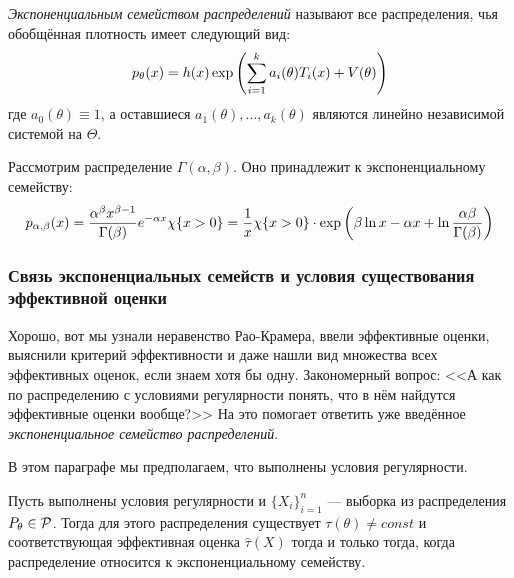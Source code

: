 \begin{definition}
	\textit{Экспоненциальным семейством распределений} называют все распределения, чья обобщённая плотность имеет следующий вид:
	\[
		p_\theta(x) = h(x)\exp\left(\sum_{i = 1}^k a_i(\theta)T_i(x) + V(\theta)\right)
	\]
	где $a_0(\theta) \equiv 1$, а оставшиеся $a_1(\theta), \ldots, a_k(\theta)$ являются линейно независимой системой на $\Theta$.
\end{definition}

\begin{example}
	Рассмотрим распределение $\Gamma(\alpha, \beta)$. Оно принадлежит к экспоненциальному семейству:
	\[
		p_{\alpha, \beta}(x) = \frac{\alpha^\beta x^{\beta - 1}}{\Gamma(\beta)} e^{-\alpha x} \chi\{x > 0\} = \frac{1}{x}\chi\{x > 0\} \cdot \exp\left(\beta \ln x - \alpha x + \ln \frac{\alpha \beta}{\Gamma(\beta)}\right)
	\]
\end{example}

\subsubsection*{Связь экспоненциальных семейств и условия существования эффективной оценки}

\begin{note}
	Хорошо, вот мы узнали неравенство Рао-Крамера, ввели эффективные оценки, выяснили критерий эффективности и даже нашли вид множества всех эффективных оценок, если знаем хотя бы одну. Закономерный вопрос: <<А как по распределению с условиями регулярности понять, что в нём найдутся эффективные оценки вообще?>> На это помогает ответить уже введённое \textit{экспоненциальное семейство распределений}.
\end{note}

\begin{note}
	В этом параграфе мы предполагаем, что выполнены условия регулярности.
\end{note}

\begin{theorem}
	Пусть выполнены условия регулярности и $\{X_i\}_{i = 1}^n$ --- выборка из распределения $P_\theta \in \mathcal{P}$. Тогда для этого распределения существует $\tau(\theta) \neq const$ и соответствующая эффективная оценка $\hat{\tau}(X)$ тогда и только тогда, когда распределение относится к экспоненциальному семейству.
\end{theorem}

